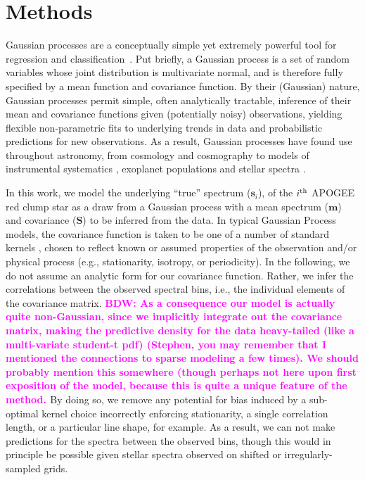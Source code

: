 \documentclass[a4paper,fleqn,usenatbib]{mnras}
\newcommand{\specmean}{{\bm m}}
\newcommand{\speccov}{{\bm S}}
\newcommand{\objspec}{{\bm s}}
\newcommand{\bdw}[1]{\textbf{\textcolor{magenta}{BDW: #1}}}
\begin{document}
\section{Methods}
\label{sec:methods}

Gaussian processes are a conceptually simple yet extremely powerful tool for regression and classification~\citep{Rasmussen_Williams}. Put briefly, a Gaussian process is a set of random variables whose joint distribution is multivariate normal, and is therefore fully specified by a mean function and covariance function. By their (Gaussian) nature, Gaussian processes permit simple, often analytically tractable, inference of their mean and covariance functions given (potentially noisy) observations, yielding flexible non-parametric fits to underlying trends in data and probabilistic predictions for new observations. As a result, Gaussian processes have found use throughout astronomy, from cosmology \citep{Bond_etal:1987} and cosmography \citep{Shafieloo_etal:2012} to models of instrumental systematics \citep{Gibson_etal:2012}, exoplanet populations \citep{DFM_etal:2014} and stellar spectra \citep{Czekala_etal:2017}.

In this work, we model the underlying ``true'' spectrum ($\objspec_i$), of the $i^{\rm th}$ APOGEE red clump star as a draw from a Gaussian process with a mean spectrum ($\specmean$) and covariance ($\speccov$) to be inferred from the data. In typical Gaussian Process models, the covariance function is taken to be one of a number of standard kernels \citep{Rasmussen_Williams}, chosen to reflect known or assumed properties of the observation and/or physical process (e.g., stationarity, isotropy, or periodicity). In the following, we do not assume an analytic form for our covariance function. Rather, we infer the correlations between the observed spectral bins, i.e., the individual elements of the covariance matrix. \bdw{As a consequence  our model is actually quite non-Gaussian, since we implicitly integrate out the covariance matrix, making the predictive density for the data heavy-tailed (like a multi-variate student-t pdf) (Stephen, you may remember that I mentioned the connections to sparse modeling a few times). We should probably mention this somewhere (though perhaps not here upon first exposition of the model, because this is quite a unique feature of the method. } By doing so, we remove any potential for bias induced by a sub-optimal kernel choice incorrectly enforcing stationarity, a single correlation length, or a particular line shape, for example. As a result, we can not make predictions for the spectra between the observed bins, though this would in principle be possible given stellar spectra observed on shifted or irregularly-sampled grids. 
\end{document}
